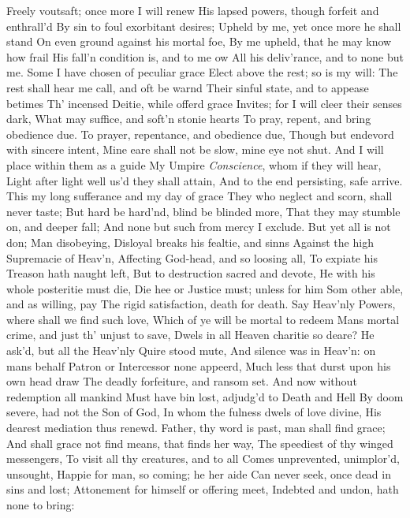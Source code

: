 \documentclass[11pt]{book}
\begin{document}
Freely voutsaft; once more I will renew 
His lapsed powers, though forfeit and enthrall'd 
By sin to foul exorbitant desires; 
Upheld by me, yet once more he shall stand 
On even ground against his mortal foe, 
By me upheld, that he may know how frail 
His fall'n condition is, and to me ow 
All his deliv'rance, and to none but me. 
Some I have chosen of peculiar grace 
Elect above the rest; so is my will: 
The rest shall hear me call, and oft be warnd 
Their sinful state, and to appease betimes 
Th' incensed Deitie, while offerd grace 
Invites; for I will cleer their senses dark, 
What may suffice, and soft'n stonie hearts 
To pray, repent, and bring obedience due. 
To prayer, repentance, and obedience due, 
Though but endevord with sincere intent, 
Mine eare shall not be slow, mine eye not shut. 
And I will place within them as a guide 
My Umpire \textit{Conscience}, whom if they will hear, 
Light after light well us'd they shall attain, 
And to the end persisting, safe arrive. 
This my long sufferance and my day of grace 
They who neglect and scorn, shall never taste; 
But hard be hard'nd, blind be blinded more, 
That they may stumble on, and deeper fall; 
And none but such from mercy I exclude. 
But yet all is not don; Man disobeying, 
Disloyal breaks his fealtie, and sinns 
Against the high Supremacie of Heav'n, 
Affecting God-head, and so loosing all, 
To expiate his Treason hath naught left, 
But to destruction sacred and devote, 
He with his whole posteritie must die, 
Die hee or Justice must; unless for him 
Som other able, and as willing, pay 
The rigid satisfaction, death for death. 
Say Heav'nly Powers, where shall we find such love, 
Which of ye will be mortal to redeem 
Mans mortal crime, and just th' unjust to save, 
Dwels in all Heaven charitie so deare? 
\quad He ask'd, but all the Heav'nly Quire stood mute, 
And silence was in Heav'n: on mans behalf 
Patron or Intercessor none appeerd, 
Much less that durst upon his own head draw 
The deadly forfeiture, and ransom set. 
And now without redemption all mankind 
Must have bin lost, adjudg'd to Death and Hell 
By doom severe, had not the Son of God, 
In whom the fulness dwels of love divine, 
His dearest mediation thus renewd. 
\quad Father, thy word is past, man shall find grace; 
And shall grace not find means, that finds her way, 
The speediest of thy winged messengers, 
To visit all thy creatures, and to all 
Comes unprevented, unimplor'd, unsought, 
Happie for man, so coming; he her aide 
Can never seek, once dead in sins and lost; 
Attonement for himself or offering meet, 
Indebted and undon, hath none to bring: 
\end{document}

